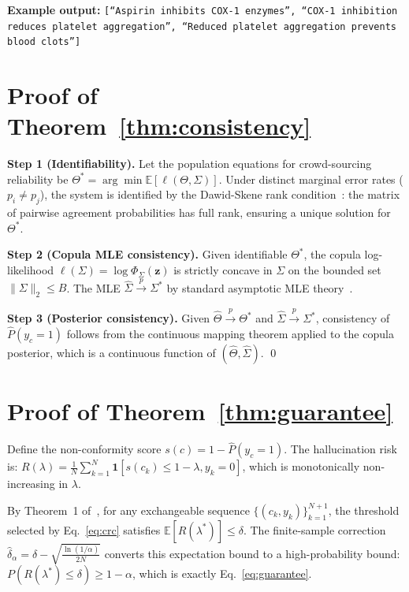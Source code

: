 \textbf{Example output:}
\texttt{[``Aspirin inhibits COX-1 enzymes'',
``COX-1 inhibition reduces platelet aggregation'',
``Reduced platelet aggregation prevents blood clots'']}

\section{Proof of Theorem~\ref{thm:consistency}}
\label{app:proofB}

\textbf{Step 1 (Identifiability).}
Let the population equations for crowd-sourcing reliability
be $\Theta^* = \arg\min \mathbb{E}[\ell(\Theta, \Sigma)]$.
Under distinct marginal error rates ($p_i \neq p_j$),
the system is identified by the Dawid-Skene rank
condition~\cite{zhang2014}: the matrix of pairwise
agreement probabilities has full rank, ensuring a unique
solution for $\Theta^*$.

\textbf{Step 2 (Copula MLE consistency).}
Given identifiable $\Theta^*$, the copula log-likelihood
$\ell(\Sigma) = \log \Phi_\Sigma(\mathbf{z})$ is strictly concave
in $\Sigma$ on the bounded set $\|\Sigma\|_2 \leq B$.
The MLE $\hat{\Sigma} \xrightarrow{p} \Sigma^*$ by standard
asymptotic MLE theory~\cite{nelsen2006}.

\textbf{Step 3 (Posterior consistency).}
Given $\hat{\Theta} \xrightarrow{p} \Theta^*$ and
$\hat{\Sigma} \xrightarrow{p} \Sigma^*$,
consistency of $\hat{P}(y_c = 1)$ follows from the
continuous mapping theorem applied to the copula posterior,
which is a continuous function of $(\hat{\Theta}, \hat{\Sigma})$.
\qed

\section{Proof of Theorem~\ref{thm:guarantee}}
\label{app:proofC}

Define the non-conformity score
$s(c) = 1 - \hat{P}(y_c = 1)$.
The hallucination risk is:
$R(\lambda) = \frac{1}{N}\sum_{k=1}^N \mathbf{1}[s(c_k) \leq 1-\lambda, y_k = 0]$,
which is monotonically non-increasing in $\lambda$.

By Theorem~1 of~\citet{angelopoulos2022crc}, for any
exchangeable sequence $\{(c_k, y_k)\}_{k=1}^{N+1}$,
the threshold selected by Eq.~\eqref{eq:crc} satisfies
$\mathbb{E}[R(\lambda^*)] \leq \delta$.
The finite-sample correction
$\hat{\delta}_\alpha = \delta - \sqrt{\frac{\ln(1/\alpha)}{2N}}$
converts this expectation bound to a
high-probability bound: $P(R(\lambda^*) \leq \delta) \geq 1 - \alpha$,
which is exactly Eq.~\eqref{eq:guarantee}.


